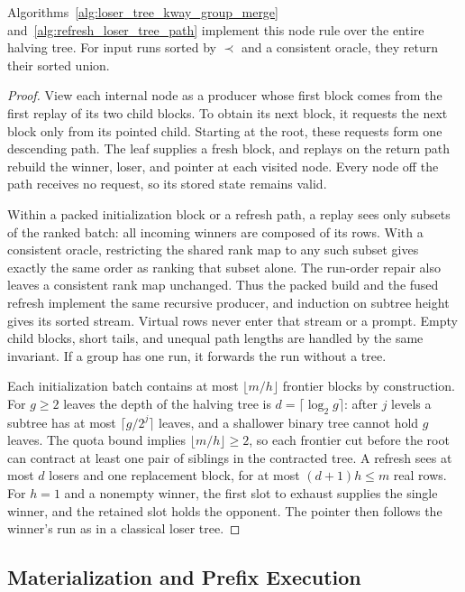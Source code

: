 \begin{lemma}
Algorithms~\ref{alg:loser_tree_kway_group_merge} and~\ref{alg:refresh_loser_tree_path} implement this node rule over the entire halving tree. For input runs sorted by $\prec$ and a consistent oracle, they return their sorted union.
\end{lemma}
\begin{proof}
View each internal node as a producer whose first block comes from the first replay of its two child blocks. To obtain its next block, it requests the next block only from its pointed child. Starting at the root, these requests form one descending path. The leaf supplies a fresh block, and replays on the return path rebuild the winner, loser, and pointer at each visited node. Every node off the path receives no request, so its stored state remains valid.

Within a packed initialization block or a refresh path, a replay sees only subsets of the ranked batch: all incoming winners are composed of its rows. With a consistent oracle, restricting the shared rank map to any such subset gives exactly the same order as ranking that subset alone. The run-order repair also leaves a consistent rank map unchanged. Thus the packed build and the fused refresh implement the same recursive producer, and induction on subtree height gives its sorted stream. Virtual rows never enter that stream or a prompt. Empty child blocks, short tails, and unequal path lengths are handled by the same invariant. If a group has one run, it forwards the run without a tree.

Each initialization batch contains at most $\lfloor m/h\rfloor$ frontier blocks by construction. For $g\ge2$ leaves the depth of the halving tree is $d=\lceil\log_2 g\rceil$: after $j$ levels a subtree has at most $\lceil g/2^j\rceil$ leaves, and a shallower binary tree cannot hold $g$ leaves. The quota bound implies $\lfloor m/h\rfloor\ge2$, so each frontier cut before the root can contract at least one pair of siblings in the contracted tree. A refresh sees at most $d$ losers and one replacement block, for at most $(d+1)h\le m$ real rows. For $h=1$ and a nonempty winner, the first slot to exhaust supplies the single winner, and the retained slot holds the opponent. The pointer then follows the winner's run as in a classical loser tree.
\end{proof}

\subsection{Materialization and Prefix Execution}
\label{app:proof-limit}

